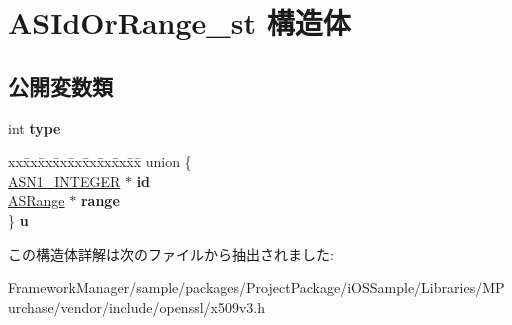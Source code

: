 \hypertarget{struct_a_s_id_or_range__st}{}\section{A\+S\+Id\+Or\+Range\+\_\+st 構造体}
\label{struct_a_s_id_or_range__st}
\subsection*{公開変数類}
\begin{DoxyCompactItemize}
\item 
\hypertarget{struct_a_s_id_or_range__st_a6abc25c7fdb4a6799aad3531067e9ec9}{}int {\bfseries type}\label{struct_a_s_id_or_range__st_a6abc25c7fdb4a6799aad3531067e9ec9}

\item 
\hypertarget{struct_a_s_id_or_range__st_aa5aac9a991891f481a4864a1bcd05ee7}{}\begin{tabbing}
xx\=xx\=xx\=xx\=xx\=xx\=xx\=xx\=xx\=\kill
union \{\\
\>\hyperlink{structasn1__string__st}{ASN1\_INTEGER} $\ast$ {\bfseries id}\\
\>\hyperlink{struct_a_s_range__st}{ASRange} $\ast$ {\bfseries range}\\
\} {\bfseries u}\label{struct_a_s_id_or_range__st_aa5aac9a991891f481a4864a1bcd05ee7}
\\

\end{tabbing}\end{DoxyCompactItemize}


この構造体詳解は次のファイルから抽出されました\+:\begin{DoxyCompactItemize}
\item 
Framework\+Manager/sample/packages/\+Project\+Package/i\+O\+S\+Sample/\+Libraries/\+M\+Purchase/vendor/include/openssl/x509v3.\+h\end{DoxyCompactItemize}
